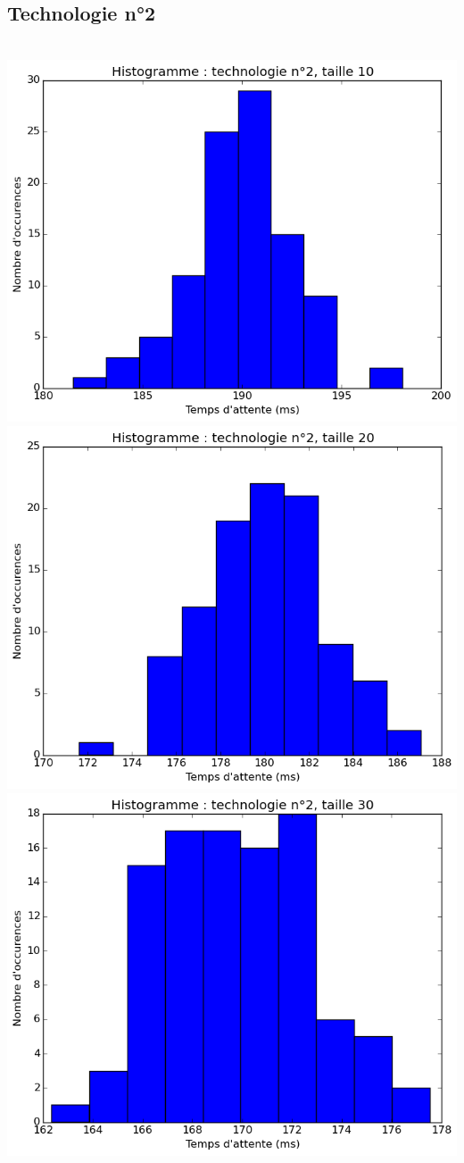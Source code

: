 \documentclass[a4paper,10pt]{article}
\begin{document}
\subsection{Technologie n°2}
\\
\includegraphics[scale=0.4]{img/2-10.png}
\includegraphics[scale=0.4]{img/2-20.png}
\\
\includegraphics[scale=0.4]{img/2-30.png}
\end{document}
